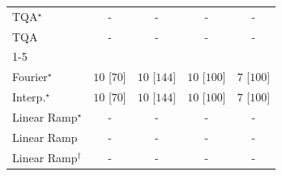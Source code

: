 \begin{tabular}{l|cccc|}
TQA$^\star$ & {\cellcolor[HTML]{000000}} \color[HTML]{F1F1F1} {\cellcolor{white}} \color{black} - & {\cellcolor[HTML]{000000}} \color[HTML]{F1F1F1} {\cellcolor{white}} \color{black} - & {\cellcolor[HTML]{000000}} \color[HTML]{F1F1F1} {\cellcolor{white}} \color{black} - & {\cellcolor[HTML]{000000}} \color[HTML]{F1F1F1} {\cellcolor{white}} \color{black} - \\
TQA & {\cellcolor[HTML]{000000}} \color[HTML]{F1F1F1} {\cellcolor{white}} \color{black} - & {\cellcolor[HTML]{000000}} \color[HTML]{F1F1F1} {\cellcolor{white}} \color{black} - & {\cellcolor[HTML]{000000}} \color[HTML]{F1F1F1} {\cellcolor{white}} \color{black} - & {\cellcolor[HTML]{000000}} \color[HTML]{F1F1F1} {\cellcolor{white}} \color{black} - \\
\cline{1-5}
\multicolumn{5}{c}{\rule{0pt}{8pt}PP} \\
\midrule
Fourier$^\star$ & {\cellcolor[HTML]{00441B}} \color[HTML]{F1F1F1} $10$ [$70$] & {\cellcolor[HTML]{00441B}} \color[HTML]{F1F1F1} $10$ [$144$] & {\cellcolor[HTML]{00441B}} \color[HTML]{F1F1F1} $10$ [$100$] & {\cellcolor[HTML]{37A055}} \color[HTML]{F1F1F1} $7$ [$100$] \\
Interp.$^\star$ & {\cellcolor[HTML]{00441B}} \color[HTML]{F1F1F1} $10$ [$70$] & {\cellcolor[HTML]{00441B}} \color[HTML]{F1F1F1} $10$ [$144$] & {\cellcolor[HTML]{00441B}} \color[HTML]{F1F1F1} $10$ [$100$] & {\cellcolor[HTML]{37A055}} \color[HTML]{F1F1F1} $7$ [$100$] \\
Linear Ramp$^\star$ & {\cellcolor[HTML]{000000}} \color[HTML]{F1F1F1} {\cellcolor{white}} \color{black} - & {\cellcolor[HTML]{000000}} \color[HTML]{F1F1F1} {\cellcolor{white}} \color{black} - & {\cellcolor[HTML]{000000}} \color[HTML]{F1F1F1} {\cellcolor{white}} \color{black} - & {\cellcolor[HTML]{000000}} \color[HTML]{F1F1F1} {\cellcolor{white}} \color{black} - \\
Linear Ramp & {\cellcolor[HTML]{000000}} \color[HTML]{F1F1F1} {\cellcolor{white}} \color{black} - & {\cellcolor[HTML]{000000}} \color[HTML]{F1F1F1} {\cellcolor{white}} \color{black} - & {\cellcolor[HTML]{000000}} \color[HTML]{F1F1F1} {\cellcolor{white}} \color{black} - & {\cellcolor[HTML]{000000}} \color[HTML]{F1F1F1} {\cellcolor{white}} \color{black} - \\
Linear Ramp$^\dagger$ & {\cellcolor[HTML]{000000}} \color[HTML]{F1F1F1} {\cellcolor{white}} \color{black} - & {\cellcolor[HTML]{000000}} \color[HTML]{F1F1F1} {\cellcolor{white}} \color{black} - & {\cellcolor[HTML]{000000}} \color[HTML]{F1F1F1} {\cellcolor{white}} \color{black} - & {\cellcolor[HTML]{000000}} \color[HTML]{F1F1F1} {\cellcolor{white}} \color{black} - \\

\end{tabular}
